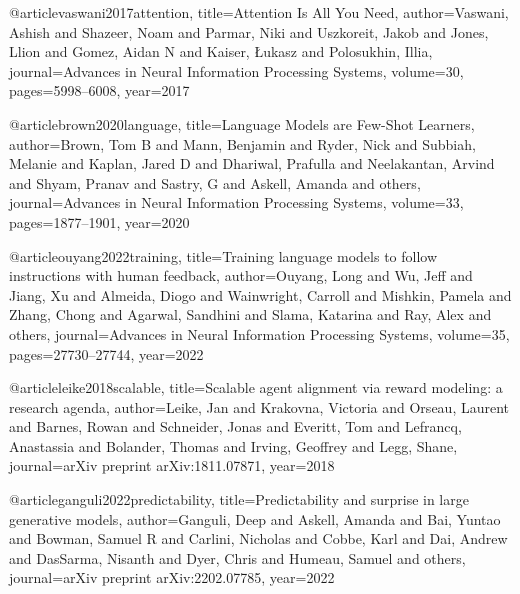 @article{vaswani2017attention,
  title={Attention Is All You Need},
  author={Vaswani, Ashish and Shazeer, Noam and Parmar, Niki and Uszkoreit, Jakob and Jones, Llion and Gomez, Aidan N and Kaiser, Łukasz and Polosukhin, Illia},
  journal={Advances in Neural Information Processing Systems},
  volume={30},
  pages={5998--6008},
  year={2017}
}

@article{brown2020language,
  title={Language Models are Few-Shot Learners},
  author={Brown, Tom B and Mann, Benjamin and Ryder, Nick and Subbiah, Melanie and Kaplan, Jared D and Dhariwal, Prafulla and Neelakantan, Arvind and Shyam, Pranav and Sastry, G and Askell, Amanda and others},
  journal={Advances in Neural Information Processing Systems},
  volume={33},
  pages={1877--1901},
  year={2020}
}

@article{ouyang2022training,
  title={Training language models to follow instructions with human feedback},
  author={Ouyang, Long and Wu, Jeff and Jiang, Xu and Almeida, Diogo and Wainwright, Carroll and Mishkin, Pamela and Zhang, Chong and Agarwal, Sandhini and Slama, Katarina and Ray, Alex and others},
  journal={Advances in Neural Information Processing Systems},
  volume={35},
  pages={27730--27744},
  year={2022}
}

@article{leike2018scalable,
  title={Scalable agent alignment via reward modeling: a research agenda},
  author={Leike, Jan and Krakovna, Victoria and Orseau, Laurent and Barnes, Rowan and Schneider, Jonas and Everitt, Tom and Lefrancq, Anastassia and Bolander, Thomas and Irving, Geoffrey and Legg, Shane},
  journal={arXiv preprint arXiv:1811.07871},
  year={2018}
}

@article{ganguli2022predictability,
  title={Predictability and surprise in large generative models},
  author={Ganguli, Deep and Askell, Amanda and Bai, Yuntao and Bowman, Samuel R and Carlini, Nicholas and Cobbe, Karl and Dai, Andrew and DasSarma, Nisanth and Dyer, Chris and Humeau, Samuel and others},
  journal={arXiv preprint arXiv:2202.07785},
  year={2022}
}



